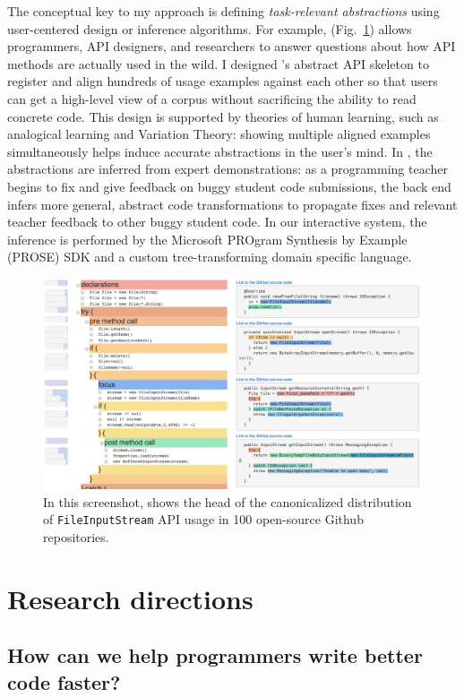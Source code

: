 \documentclass[justified]{tufte-handout}
\begin{document}
The conceptual key to my approach is defining \emph{task-relevant abstractions} using user-centered design or inference algorithms. For example,  (Fig.~\ref{fig:examplore}) allows programmers, API designers, and researchers to answer questions about how API methods are actually used in the wild.\cite{examplore} I designed 's abstract API skeleton to register and align hundreds of usage examples against each other so that users can get a high-level view of a corpus without sacrificing the ability to read concrete code. This design is supported by theories of human learning, such as analogical learning and Variation Theory: showing multiple aligned examples simultaneously helps induce accurate abstractions in the user's mind. In , the abstractions are inferred from expert demonstrations: as a programming teacher begins to fix and give feedback on buggy student code submissions, the back end infers more general, abstract code transformations to propagate fixes and relevant teacher feedback to other buggy student code.\cite{lats17} In our interactive system, the inference is performed by the Microsoft PROgram Synthesis by Example (PROSE) SDK and a custom tree-transforming domain specific language.
\begin{figure}[h]
  \includegraphics[width=0.64\linewidth]{Statistical_Code_Examples.png}
  \caption{In this screenshot,  shows the head of the canonicalized distribution of \texttt{FileInputStream} API usage in 100 open-source Github repositories.}%
  \label{fig:examplore}%
\end{figure}

\section*{Research directions}

\subsection*{How can we help programmers write better code faster?}
\end{document}
